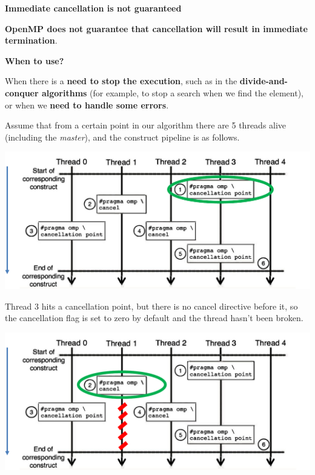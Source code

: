\begin{flushleft}
    \textcolor{Red2}{ \textbf{Immediate cancellation is not guaranteed}}
\end{flushleft}
\textbf{OpenMP does not guarantee that cancellation will result in immediate termination}.

\highspace
\begin{flushleft}
    \textcolor{Green3}{ \textbf{When to use?}}
\end{flushleft}
When there is a \textbf{need to stop the execution}, such as in the \textbf{divide-and-conquer algorithms} (for example, to stop a search when we find the element), or when we \textbf{need to handle some errors}.

\begin{examplebox}
    Assume that from a certain point in our algorithm there are 5 threads alive (including the \emph{master}), and the construct pipeline is as follows.
    \begin{center}
        \includegraphics[width=\textwidth]{img/openmp-cancel-1.pdf}
    \end{center}

    Thread 3 hits a cancellation point, but there is no cancel directive before it, so the cancellation flag is set to zero by default and the thread hasn't been broken.
    \begin{center}
        \includegraphics[width=\textwidth]{img/openmp-cancel-2.pdf}
    \end{center}


\end{examplebox}
